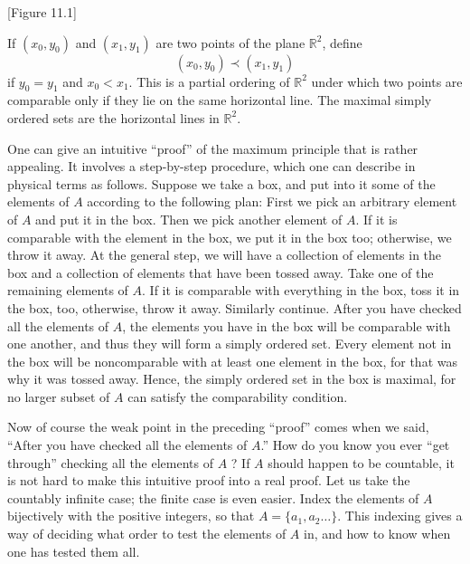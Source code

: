 [Figure 11.1]
\begin{centeredblock}
 \begin{example}
\label{ex:\thesection.\theexample}
 If \(({x_{0},y_{0}})\) and \(({x_{1},y_{1}})\) are two points of the plane \(\mathbb{R}^{2}\), define
 \[
 ({x_{0},y_{0}}) \prec ({x_{1},y_{1}})
 \]
 if \(y_{0} = y_{1}\) and \(x_{0} < x_{1}\). This is a partial ordering of \(\mathbb{R}^{2}\) under which two points are comparable only if they lie on the same horizontal line. The maximal simply ordered sets are the horizontal lines in \(\mathbb{R}^{2}\).
 \end{example}
\end{centeredblock}

One can give an intuitive ``proof'' of the maximum principle that is rather appealing. 
It involves a step-by-step procedure, which one can describe in physical terms as follows. 
Suppose we take a box, and put into it some of the elements of \(A\) according to the 
following plan: First we pick an arbitrary element of \(A\) and put it in the box. 
Then we pick another element of \(A\). If it is comparable with the element in the box, 
we put it in the box too; otherwise, we throw it away. At the general step, we will have 
a collection of elements in the box and a collection of elements that have been tossed away. 
Take one of the remaining elements of \(A\). If it is comparable with everything in the box, 
toss it in the box, too, otherwise, throw it away. Similarly continue. After you have 
checked all the elements of \(A\), the elements you have in the box will be comparable with 
one another, and thus they will form a simply ordered set. Every element not in the box will 
be noncomparable with at least one element in the box, for that was why it was tossed away. 
Hence, the simply ordered set in the box is maximal, for no larger subset of \(A\) can 
satisfy the comparability condition.

Now of course the weak point in the preceding ``proof'' comes when we said, 
``After you have checked all the elements of \(A\).'' How do you know you ever 
``get through'' checking all the elements of \(A\) ? If \(A\) should happen to 
be countable, it is not hard to make this intuitive proof into a real proof. 
Let us take the countably infinite case; the finite case is even easier. 
Index the elements of \(A\) bijectively with the positive integers, 
so that \(A = \{ {a_{1},a_{2}\ldots }\}\). 
This indexing gives a way of deciding what order to test the elements of \(A\) in, 
and how to know when one has tested them all.


